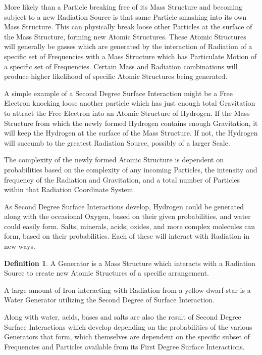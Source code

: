 \documentclass[12pt]{article}
\theoremstyle{plain}
\theoremstyle{definition}
\newtheorem{definition}{Definition}
\begin{document}
More likely than a Particle breaking free of its Mass Structure and becoming subject to a new Radiation Source is that same Particle smashing into its own Mass Structure. This can physically break loose other Particles at the surface of the Mass Structure, forming new Atomic Structures. These Atomic Structures will generally be gasses which are generated by the interaction of Radiation of a specific set of Frequencies with a Mass Structure which has Particulate Motion of a specific set of Frequencies. Certain Mass and Radiation combinations will produce higher likelihood of specific Atomic Structures being generated.

A simple example of a Second Degree Surface Interaction might be a Free Electron knocking loose another particle which has just enough total Gravitation to attract the Free Electron into an Atomic Structure of Hydrogen. If the Mass Structure from which the newly formed Hydrogen contains enough Gravitation, it will keep the Hydrogen at the surface of the Mass Structure. If not, the Hydrogen will succumb to the greatest Radiation Source, possibly of a larger Scale.

The complexity of the newly formed Atomic Structure is dependent on probabilities based on the complexity of any incoming Particles, the intensity and frequency of the Radiation and Gravitation, and a total number of Particles within that Radiation Coordinate System.

As Second Degree Surface Interactions develop, Hydrogen could be generated along with the occasional Oxygen, based on their given probabilities, and water could easily form. Salts, minerals, acids, oxides, and more complex molecules can form, based on their probabilities. Each of these will interact with Radiation in new ways.

\begin{definition}
A Generator is a Mass Structure which interacts with a Radiation Source to create new Atomic Structures of a specific arrangement.
\end{definition}

A large amount of Iron interacting with Radiation from a yellow dwarf star is a Water Generator utilizing the Second Degree of Surface Interaction.

Along with water, acids, bases and salts are also the result of Second Degree Surface Interactions which develop depending on the probabilities of the various Generators that form, which themselves are dependent on the specific subset of Frequencies and Particles available from its First Degree Surface Interactions.
\end{document}
